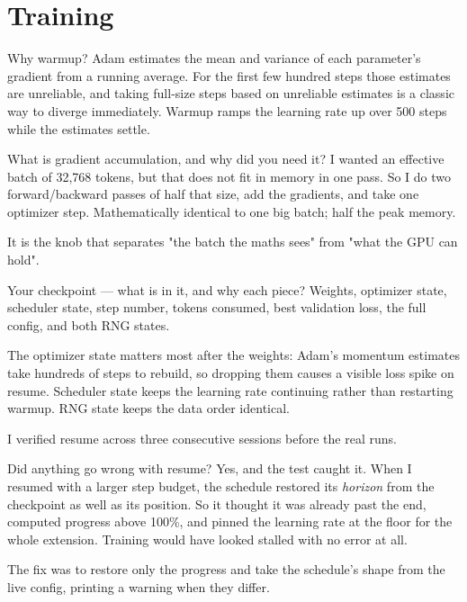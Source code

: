 \documentclass[11pt]{report}
\begin{document}
\section{Training}

\begin{qabox}{Why warmup?}
Adam estimates the mean and variance of each parameter's gradient from a running
average. For the first few hundred steps those estimates are unreliable, and
taking full-size steps based on unreliable estimates is a classic way to diverge
immediately. Warmup ramps the learning rate up over 500 steps while the estimates
settle.
\end{qabox}

\begin{qabox}{What is gradient accumulation, and why did you need it?}
I wanted an effective batch of 32,768 tokens, but that does not fit in memory in
one pass. So I do two forward/backward passes of half that size, add the
gradients, and take one optimizer step. Mathematically identical to one big batch;
half the peak memory.

It is the knob that separates "the batch the maths sees" from "what the GPU can
hold".
\end{qabox}

\begin{qabox}{Your checkpoint --- what is in it, and why each piece?}
Weights, optimizer state, scheduler state, step number, tokens consumed, best
validation loss, the full config, and both RNG states.

The optimizer state matters most after the weights: Adam's momentum estimates take
hundreds of steps to rebuild, so dropping them causes a visible loss spike on
resume. Scheduler state keeps the learning rate continuing rather than restarting
warmup. RNG state keeps the data order identical.

I verified resume across three consecutive sessions before the real runs.
\end{qabox}

\begin{qabox}{Did anything go wrong with resume?}
Yes, and the test caught it. When I resumed with a larger step budget, the
schedule restored its \emph{horizon} from the checkpoint as well as its position.
So it thought it was already past the end, computed progress above 100\%, and
pinned the learning rate at the floor for the whole extension. Training would have
looked stalled with no error at all.

The fix was to restore only the progress and take the schedule's shape from the
live config, printing a warning when they differ.
\end{qabox}
\end{document}

